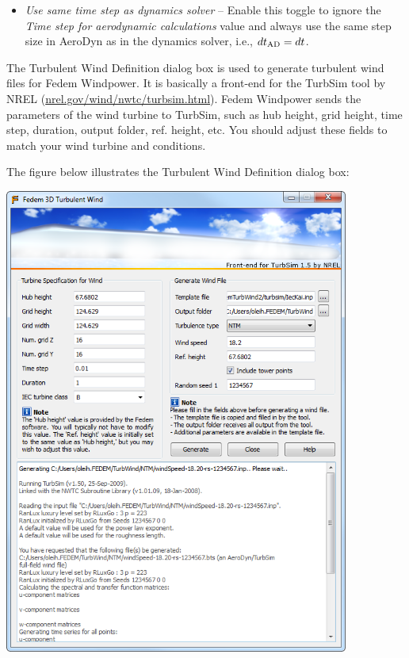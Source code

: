 \begin{itemize}
\item{\sl Use same time step as dynamics solver} --
  Enable this toggle to ignore the {\sl Time step for aerodynamic calculations}
  value and always use the same step size in AeroDyn as in the dynamics solver,
  i.e., $dt_{\rm AD}=dt$.
\end{itemize}


The Turbulent Wind Definition dialog box is used to generate turbulent wind
files for Fedem Windpower. It is basically a front-end for the TurbSim tool by
NREL (\href{https://www.nrel.gov/wind/nwtc/turbsim.html}
           {nrel.gov/wind/nwtc/turbsim.html}).
Fedem Windpower sends the parameters of the wind turbine to TurbSim, such as
hub height, grid height, time step, duration, output folder, ref. height, etc.
You should adjust these fields to match your wind turbine and conditions.

The figure below illustrates the Turbulent Wind Definition dialog box:

\clearpage
\includegraphics[width=0.85\textwidth]{Figures/3b-TurbWind}

